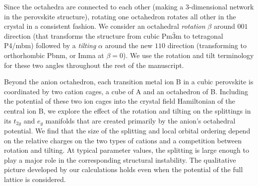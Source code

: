 \documentclass[a4paper,prb,twocolumn]{revtex4-1}  %
\newcommand{\com}[1]{}
\begin{document}

Since the octahedra are connected to each other 
(making a 3-dimensional network in the perovskite structure),
rotating one octahedron rotates all other in the crystal in a consistent fashion.
We consider an octahedral \emph{rotation} $\beta$ around $001$ direction
(that transforms the structure from cubic Pm$\bar 3$m to tetragonal P4/mbm)
followed by a \emph{tilting} $\alpha$ around the new $110$ direction
(transforming to orthorhombic Pbnm, 
or Imma 
 at ${\beta=0}$).
We use the rotation and tilt terminology for these 
two angles throughout the rest of the manuscript.


Beyond the anion octahedron,
each transition metal ion B in a cubic perovskite
is coordinated by two cation cages,
a cube of A and an octahedron of B.
Including the 
potential of these two ion cages
into the 
crystal field Hamiltonian of 
the central ion B,
we explore the effect 
of the rotation and tilting on 
the splittings in its $t_{2g}$ and $e_g$ manifolds
that are
created primarily by the anion's octahedral potential.
We find that the size of the splitting 
and local orbital ordering
depend
on the relative charges on the two types of cations
and a competition between rotation and tilting.
At typical parameter values,
the splitting is large enough 
to play a major role in 
the corresponding structural instability. 
The qualitative picture developed by our calculations 
holds even when the potential of the full lattice is considered.



\com{
$\alpha=0, \beta \neq 0$\\
Tetragonal:
127. P 4 / m b m
$\alpha \neq 0,\beta=0$\\
Orthorhombic:
74. I m m a
$\alpha,\beta \neq 0$\\
Orthorhombic:
62. Pbnm
}
\end{document}

